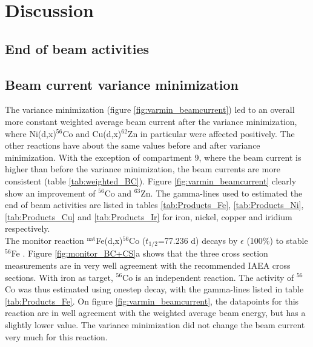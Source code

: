 \chapter{Discussion}

\section{End of beam activities}

\section{Beam current variance minimization}

The variance minimization (figure \ref{fig:varmin_beamcurrent}) led to an overall more constant weighted average beam current after the variance minimization, where Ni(d,x)$^{56}$Co and Cu(d,x)$^{62}$Zn in particular were affected positively. The other reactions have about the same values before and after variance minimization. With the exception of compartment 9, where the beam current is higher than before the variance minimization, the beam currents are more consistent (table \ref{tab:weighted_BC}). Figure \ref{fig:varmin_beamcurrent} clearly show an improvement of $^{56}$Co and $^{63}$Zn. The gamma-lines used to estimated the end of beam activities are listed in tables \ref{tab:Products_Fe}, \ref{tab:Products_Ni}, \ref{tab:Products_Cu} and \ref{tab:Products_Ir} for iron, nickel, copper and iridium respectively. \\ 

\noindent
The monitor reaction  $^\text{nat}$Fe(d,x)$^{56}$Co ($t_{1/2}$=77.236 d) decays by $\epsilon$ (100\%) to stable $^{56}$Fe \cite{Junde2011}. Figure \ref{fig:monitor_BC+CS}a shows that the three cross section measurements are in very well agreement with the recommended IAEA cross sections. With iron as target, $^{56}$Co is an independent reaction. The activity of $^{56}$Co was thus estimated using onestep decay, with the gamma-lines listed in table \ref{tab:Products_Fe}. On figure \ref{fig:varmin_beamcurrent}, the datapoints for this reaction are in well agreement with the weighted average beam energy, but has a slightly lower value. The variance minimization did not change the beam current very much for this reaction. \\

